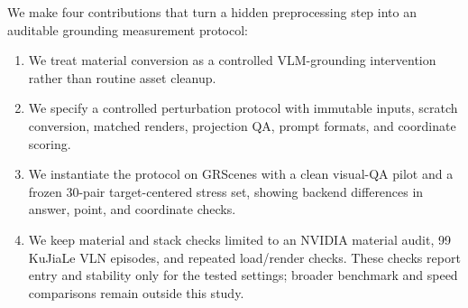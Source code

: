 We make four contributions that turn a hidden preprocessing step into an
auditable grounding measurement protocol:
\begin{enumerate}
    \item We treat material conversion as a controlled VLM-grounding
    intervention rather than routine asset cleanup.
    \item We specify a controlled perturbation protocol with immutable
    inputs, scratch conversion, matched renders, projection QA, prompt
    formats, and coordinate scoring.
    \item We instantiate the protocol on GRScenes with a clean visual-QA
    pilot and a frozen 30-pair target-centered stress set, showing backend
    differences in answer, point, and coordinate checks.
    \item We keep material and stack checks limited to an NVIDIA material audit,
    99 KuJiaLe VLN episodes, and repeated load/render checks. These checks
    report entry and stability only for the tested settings; broader benchmark and
    speed comparisons remain outside this study.
\end{enumerate}
